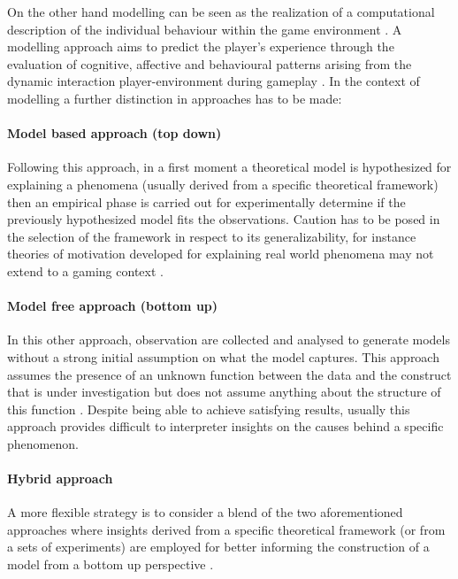 On the other hand modelling can be seen as the realization of a computational description of the individual behaviour within the game environment \cite{yannakakis2013player}. A modelling approach aims to predict the player’s experience through the evaluation of cognitive, affective and behavioural patterns arising from the dynamic interaction player-environment during gameplay \cite{yannakakis2013player}. In the context of modelling a further distinction in approaches has to be made:

\paragraph*{Model based approach (top down)} Following this approach, in a first moment a theoretical model is hypothesized for explaining a phenomena (usually derived from a specific theoretical framework) then an empirical phase is carried out for experimentally determine if the previously hypothesized model fits the observations. Caution has to be posed in the selection of the framework in respect to its generalizability, for instance theories of motivation developed for explaining real world phenomena may not extend to a gaming context \cite{yannakakis2013player}.

\paragraph*{Model free approach (bottom up)} In this other approach, observation are collected and analysed to generate models without a strong initial assumption on what the model captures. This approach assumes the presence of an unknown function between the data and the construct that is under investigation but does not assume anything about the structure of this function \cite{yannakakis2013player}. Despite being able to achieve satisfying results, usually this approach provides difficult to interpreter insights on the causes behind a specific phenomenon.

\paragraph*{Hybrid approach} A more flexible strategy is to consider a blend of the two aforementioned approaches where insights derived from a specific theoretical framework (or from a sets of experiments) are employed for better informing the construction of a model from a bottom up perspective \cite{yannakakis2013player}. 

